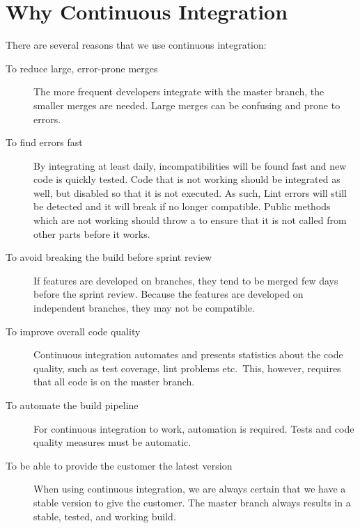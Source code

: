 \section{Why Continuous Integration}
There are several reasons that we use continuous integration:
\begin{description}
  \item[To reduce large, error-prone merges] The more frequent developers integrate with the master branch, the smaller merges are needed. Large merges can be confusing and prone to errors.
  \item[To find errors fast] By integrating at least daily, incompatibilities will be found fast and new code is quickly tested. Code that is not working should be integrated as well, but disabled so that it is not executed. As such, Lint errors will still be detected and it will break if no longer compatible. Public methods which are not working should throw a  to ensure that it is not called from other parts before it works.
  \item[To avoid breaking the build before sprint review] If features are developed on branches, they tend to be merged few days before the sprint review. Because the features are developed on independent branches, they may not be compatible.
  \item[To improve overall code quality] Continuous integration automates and presents statistics about the code quality, such as test coverage, lint problems etc.\ This, however, requires that all code is on the master branch.
  \item[To automate the build pipeline] For continuous integration to work, automation is required. Tests and code quality measures must be automatic.
  \item[To be able to provide the customer the latest version] When using continuous integration, we are always certain that we have a stable version to give the customer. The master branch always results in a stable, tested, and working build.
\end{description}